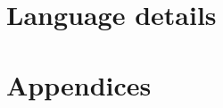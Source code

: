 \documentclass[a4paper,10pt,twoside]{book}
\begin{document}
\part{Language details}

%
%


\appendix
\part{Appendices}



{\small\raggedright\printindex}
\cleardoublepage
~ %
\cleardoublepage
~ %
\cleardoublepage
\end{document}
